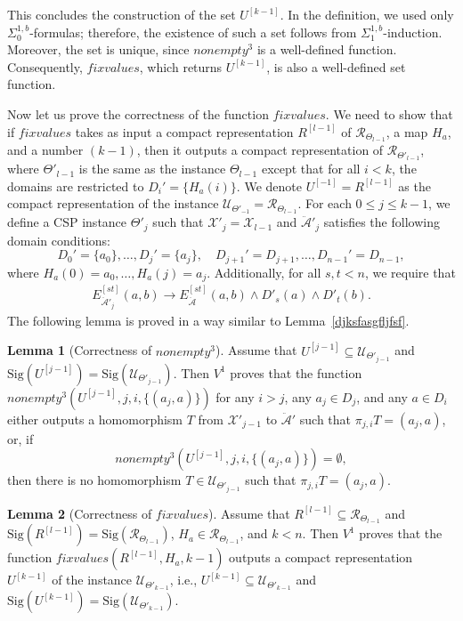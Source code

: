\documentclass{article}
\theoremstyle{definition}
\theoremstyle{theorem}
\newtheorem{lem}{Lemma}
\theoremstyle{theorem}
\theoremstyle{remark}
\theoremstyle{remark}
\theoremstyle{example}
\theoremstyle{notation}
\theoremstyle{theorem}
\begin{document}
This concludes the construction of the set $U^{[k-1]}$. In the definition, we used only $\Sigma^{1,b}_0$-formulas; therefore, the existence of such a set follows from $\Sigma^{1,b}_1$-induction. Moreover, the set is unique, since $nonempty^3$ is a well-defined function. Consequently, $fixvalues$, which returns $U^{[k-1]}$, is also a well-defined set function.

Now let us prove the correctness of the function $fixvalues$. We need to show that if $fixvalues$ takes as input a compact representation $R^{[l-1]}$ of $\mathscr{R}_{\Theta_{l-1}}$, a map $H_a$, and a number $(k-1)$, then it outputs a compact representation of $\mathscr{R}_{\Theta'_{l-1}}$, where $\Theta'_{l-1}$ is the same as the instance $\Theta_{l-1}$ except that for all $i < k$, the domains are restricted to $D_i' = \{H_a(i)\}$. We denote $U^{[-1]} = R^{[l-1]}$ as the compact representation of the instance $\mathscr{U}_{\Theta'_{-1}} = \mathscr{R}_{\Theta_{l-1}}$. For each $0 \leq j \leq k - 1$, we define a CSP instance $\Theta'_j$ such that $\mathcal{X}'_j = \mathcal{X}_{l-1}$ and $\ddot{\mathcal{A}}'_j$ satisfies the following domain conditions:
\[
D_0' = \{a_0\}, \ldots, D_j' = \{a_j\}, \quad D_{j+1}' = D_{j+1}, \ldots, D_{n-1}' = D_{n-1},
\]
where $H_a(0) = a_0, \ldots, H_a(j) = a_j$. Additionally, for all $s, t < n$, we require that
\begin{equation}
    \begin{gathered}
        E_{\ddot{\mathcal{A}}'_j}^{[st]}(a, b) \rightarrow E_{\ddot{\mathcal{A}}}^{[st]}(a, b) \wedge D'_s(a) \wedge D'_t(b).
    \end{gathered}
\end{equation}
The following lemma is proved in a way similar to Lemma~\ref{djksfasgfljfsf}.

\begin{lem}[Correctness of $nonempty^3$]\label{=a=-sify34gtth}
Assume that $U^{[j-1]} \subseteq \mathscr{U}_{\Theta'_{j-1}}$ and $\mathrm{Sig}(U^{[j-1]}) = \mathrm{Sig}(\mathscr{U}_{\Theta'_{j-1}})$. Then 
$V^1$ proves that the function $nonempty^3(U^{[j-1]}, j, i, \{(a_j, a)\})$ for any $i > j$, any $a_j \in D_j$, and any $a \in D_i$ either outputs a homomorphism $T$ from $\mathcal{X}'_{j-1}$ to $\ddot{\mathcal{A}}'$ such that $\pi_{j,i}T = (a_j, a)$, or, if
\[
nonempty^3(U^{[j-1]}, j, i, \{(a_j, a)\}) = \emptyset,
\]
then there is no homomorphism $T \in \mathscr{U}_{\Theta'_{j-1}}$ such that $\pi_{j,i}T = (a_j, a)$.
\end{lem}

\begin{lem}[Correctness of $fixvalues$]\label{alksjdca;syfrg}
Assume that $R^{[l-1]} \subseteq \mathscr{R}_{\Theta_{l-1}}$ and $\mathrm{Sig}(R^{[l-1]}) = \mathrm{Sig}(\mathscr{R}_{\Theta_{l-1}})$, $H_a\in \mathscr{R}_{\Theta_{l-1}}$, and $k < n$. Then $V^1$ proves that the function $fixvalues(R^{[l-1]}, H_a, k-1)$ outputs a compact representation $U^{[k-1]}$ of the instance $\mathscr{U}_{\Theta'_{k-1}}$, i.e., $U^{[k-1]} \subseteq \mathscr{U}_{\Theta'_{k-1}}$ and $\mathrm{Sig}(U^{[k-1]}) = \mathrm{Sig}(\mathscr{U}_{\Theta'_{k-1}})$.
\end{lem}
\end{document}
